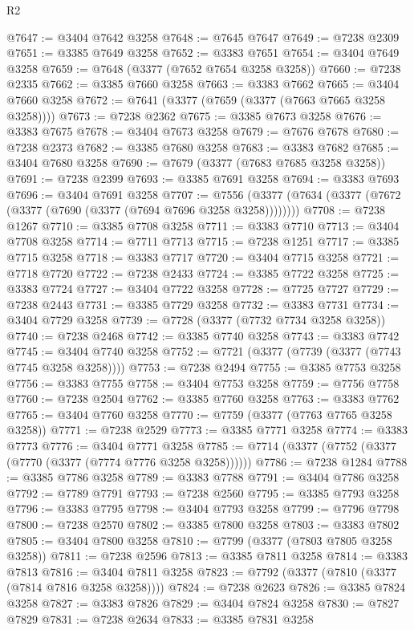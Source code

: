 \begin{lexlean}{R2}
\begin{coremodule}
@7647 := @3404 @7642 @3258
@7648 := @7645 @7647
@7649 := @7238 @2309
@7651 := @3385 @7649 @3258
@7652 := @3383 @7651
@7654 := @3404 @7649 @3258
@7659 := @7648 (@3377 (@7652 @7654 @3258 @3258))
@7660 := @7238 @2335
@7662 := @3385 @7660 @3258
@7663 := @3383 @7662
@7665 := @3404 @7660 @3258
@7672 := @7641 (@3377 (@7659 (@3377 (@7663 @7665 @3258 @3258))))
@7673 := @7238 @2362
@7675 := @3385 @7673 @3258
@7676 := @3383 @7675
@7678 := @3404 @7673 @3258
@7679 := @7676 @7678
@7680 := @7238 @2373
@7682 := @3385 @7680 @3258
@7683 := @3383 @7682
@7685 := @3404 @7680 @3258
@7690 := @7679 (@3377 (@7683 @7685 @3258 @3258))
@7691 := @7238 @2399
@7693 := @3385 @7691 @3258
@7694 := @3383 @7693
@7696 := @3404 @7691 @3258
@7707 := @7556 (@3377 (@7634 (@3377 (@7672 (@3377 (@7690 (@3377 (@7694 @7696 @3258 @3258))))))))
@7708 := @7238 @1267
@7710 := @3385 @7708 @3258
@7711 := @3383 @7710
@7713 := @3404 @7708 @3258
@7714 := @7711 @7713
@7715 := @7238 @1251
@7717 := @3385 @7715 @3258
@7718 := @3383 @7717
@7720 := @3404 @7715 @3258
@7721 := @7718 @7720
@7722 := @7238 @2433
@7724 := @3385 @7722 @3258
@7725 := @3383 @7724
@7727 := @3404 @7722 @3258
@7728 := @7725 @7727
@7729 := @7238 @2443
@7731 := @3385 @7729 @3258
@7732 := @3383 @7731
@7734 := @3404 @7729 @3258
@7739 := @7728 (@3377 (@7732 @7734 @3258 @3258))
@7740 := @7238 @2468
@7742 := @3385 @7740 @3258
@7743 := @3383 @7742
@7745 := @3404 @7740 @3258
@7752 := @7721 (@3377 (@7739 (@3377 (@7743 @7745 @3258 @3258))))
@7753 := @7238 @2494
@7755 := @3385 @7753 @3258
@7756 := @3383 @7755
@7758 := @3404 @7753 @3258
@7759 := @7756 @7758
@7760 := @7238 @2504
@7762 := @3385 @7760 @3258
@7763 := @3383 @7762
@7765 := @3404 @7760 @3258
@7770 := @7759 (@3377 (@7763 @7765 @3258 @3258))
@7771 := @7238 @2529
@7773 := @3385 @7771 @3258
@7774 := @3383 @7773
@7776 := @3404 @7771 @3258
@7785 := @7714 (@3377 (@7752 (@3377 (@7770 (@3377 (@7774 @7776 @3258 @3258))))))
@7786 := @7238 @1284
@7788 := @3385 @7786 @3258
@7789 := @3383 @7788
@7791 := @3404 @7786 @3258
@7792 := @7789 @7791
@7793 := @7238 @2560
@7795 := @3385 @7793 @3258
@7796 := @3383 @7795
@7798 := @3404 @7793 @3258
@7799 := @7796 @7798
@7800 := @7238 @2570
@7802 := @3385 @7800 @3258
@7803 := @3383 @7802
@7805 := @3404 @7800 @3258
@7810 := @7799 (@3377 (@7803 @7805 @3258 @3258))
@7811 := @7238 @2596
@7813 := @3385 @7811 @3258
@7814 := @3383 @7813
@7816 := @3404 @7811 @3258
@7823 := @7792 (@3377 (@7810 (@3377 (@7814 @7816 @3258 @3258))))
@7824 := @7238 @2623
@7826 := @3385 @7824 @3258
@7827 := @3383 @7826
@7829 := @3404 @7824 @3258
@7830 := @7827 @7829
@7831 := @7238 @2634
@7833 := @3385 @7831 @3258

\end{coremodule}
\end{lexlean}
